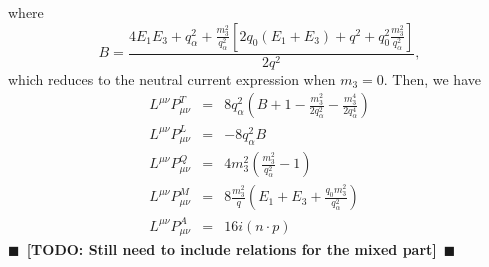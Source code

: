 \documentclass[12pt,letter]{article}
\newcommand{\todo}[1]{{$\blacksquare$~\textbf{\color{blue}[TODO: #1]}}~$\blacksquare$}
\begin{document}
where 
\begin{equation}
B = \frac{4 E_1 E_3 + q_\alpha^2 
+ \frac{m_3^2}{q_\alpha^2}\left[2q_0(E_1+E_3) + q^2 
+ q_0^2 \frac{m_3^2}{q_\alpha^2}\right]}{2 q^2}, 
\end{equation}
which reduces to the neutral current expression when 
$m_3=0$. Then, we have
\begin{eqnarray}
L^{\mu \nu} P^T_{\mu \nu} &=& 8 q_\alpha^2
\left(B + 1 - \frac{m_3^2}{2 q_\alpha^2} - \frac{m_3^4}{2 q_\alpha^4}\right) \\  
L^{\mu \nu} P^L_{\mu \nu} &=&-8 q_\alpha^2 B \\
L^{\mu \nu} P^Q_{\mu \nu} &=& 4 m_3^2\left(\frac{m_3^2}{q_\alpha^2} - 1\right) \\
L^{\mu \nu} P^M_{\mu \nu} &=& 8 \frac{m_3^2}{q} 
\left(E_1 + E_3 + \frac{q_0 m_3^2}{q_\alpha^2} \right) \\
L^{\mu \nu} P^A_{\mu \nu} &=& 16 i (n \cdot p) 
\end{eqnarray}
\todo{Still need to include relations for the mixed part}
\end{document}
